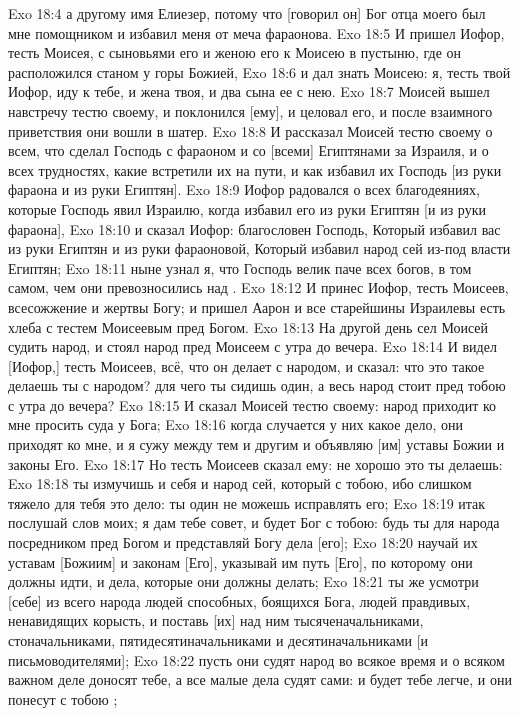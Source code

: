 \vs Exo 18:4 а другому имя Елиезер, потому что [говорил он] Бог отца моего был мне помощником и избавил меня от меча фараонова.
\vs Exo 18:5 И пришел Иофор, тесть Моисея, с сыновьями его и женою его к Моисею в пустыню, где он расположился станом у горы Божией,
\vs Exo 18:6 и дал знать Моисею: я, тесть твой Иофор, иду к тебе, и жена твоя, и два сына ее с нею.
\vs Exo 18:7 Моисей вышел навстречу тестю своему, и поклонился [ему], и целовал его, и после взаимного приветствия они вошли в шатер.
\vs Exo 18:8 И рассказал Моисей тестю своему о всем, что сделал Господь с фараоном и со [всеми] Египтянами за Израиля, и о всех трудностях, какие встретили их на пути, и как избавил их Господь [из руки фараона и из руки Египтян].
\vs Exo 18:9 Иофор радовался о всех благодеяниях, которые Господь явил Израилю, когда избавил его из руки Египтян [и из руки фараона],
\vs Exo 18:10 и сказал Иофор: благословен Господь, Который избавил вас из руки Египтян и из руки фараоновой, Который избавил народ сей из-под власти Египтян;
\vs Exo 18:11 ныне узнал я, что Господь велик паче всех богов, в том самом, чем они превозносились над .
\vs Exo 18:12 И принес Иофор, тесть Моисеев, всесожжение и жертвы Богу; и пришел Аарон и все старейшины Израилевы есть хлеба с тестем Моисеевым пред Богом.
\rsbpar\vs Exo 18:13 На другой день сел Моисей судить народ, и стоял народ пред Моисеем с утра до вечера.
\vs Exo 18:14 И видел [Иофор,] тесть Моисеев, всё, что он делает с народом, и сказал: что это такое делаешь ты с народом? для чего ты сидишь один, а весь народ стоит пред тобою с утра до вечера?
\vs Exo 18:15 И сказал Моисей тестю своему: народ приходит ко мне просить суда у Бога;
\vs Exo 18:16 когда случается у них какое дело, они приходят ко мне, и я сужу между тем и другим и объявляю [им] уставы Божии и законы Его.
\vs Exo 18:17 Но тесть Моисеев сказал ему: не хорошо это ты делаешь:
\vs Exo 18:18 ты измучишь и себя и народ сей, который с тобою, ибо слишком тяжело для тебя это дело: ты один не можешь исправлять его;
\vs Exo 18:19 итак послушай слов моих; я дам тебе совет, и будет Бог с тобою: будь ты для народа посредником пред Богом и представляй Богу дела [его];
\vs Exo 18:20 научай их уставам [Божиим] и законам [Его], указывай им путь [Его], по которому они должны идти, и дела, которые они должны делать;
\vs Exo 18:21 ты же усмотри [себе] из всего народа людей способных, боящихся Бога, людей правдивых, ненавидящих корысть, и поставь [их] над ним тысяченачальниками, стоначальниками, пятидесятиначальниками и десятиначальниками [и письмоводителями];
\vs Exo 18:22 пусть они судят народ во всякое время и о всяком важном деле доносят тебе, а все малые дела судят сами: и будет тебе легче, и они понесут с тобою ;
